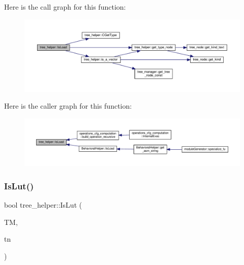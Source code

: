 Here is the call graph for this function\+:
\nopagebreak
\begin{figure}[H]
\begin{center}
\leavevmode
\includegraphics[width=350pt]{d7/d99/classtree__helper_af59d37bb4b3cdfddc3973686f17d3deb_cgraph}
\end{center}
\end{figure}
Here is the caller graph for this function\+:
\nopagebreak
\begin{figure}[H]
\begin{center}
\leavevmode
\includegraphics[width=350pt]{d7/d99/classtree__helper_af59d37bb4b3cdfddc3973686f17d3deb_icgraph}
\end{center}
\end{figure}
\mbox{\label{classtree__helper_a3a01e21342fdb1f1c65b383e8bc12d4b}} 
\subsubsection{\texorpdfstring{Is\+Lut()}{IsLut()}}
{\footnotesize\ttfamily bool tree\+\_\+helper\+::\+Is\+Lut (\begin{DoxyParamCaption}\item[{const \hyperlink{tree__manager_8hpp_a792e3f1f892d7d997a8d8a4a12e39346}{tree\+\_\+manager\+Const\+Ref} \&}]{TM,  }\item[{const \hyperlink{tree__node_8hpp_a3cf5d02292c940f3892425a5b5fdec3c}{tree\+\_\+node\+Const\+Ref} \&}]{tn }\end{DoxyParamCaption})\hspace{0.3cm}{\ttfamily [static]}}



